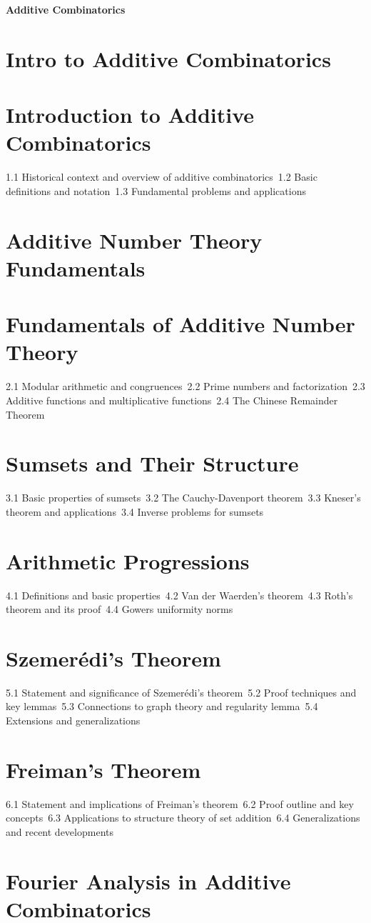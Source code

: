 {\LARGE \bf{Additive Combinatorics}}
\section{Intro to Additive Combinatorics}
\section{Introduction to Additive Combinatorics}
1.1 Historical context and overview of additive combinatorics\
1.2 Basic definitions and notation\
1.3 Fundamental problems and applications\
\section{Additive Number Theory Fundamentals}
\section{Fundamentals of Additive Number Theory}
2.1 Modular arithmetic and congruences\
2.2 Prime numbers and factorization\
2.3 Additive functions and multiplicative functions\
2.4 The Chinese Remainder Theorem\
\section{Sumsets and Their Structure}
3.1 Basic properties of sumsets\
3.2 The Cauchy-Davenport theorem\
3.3 Kneser's theorem and applications\
3.4 Inverse problems for sumsets\
\section{Arithmetic Progressions}
4.1 Definitions and basic properties\
4.2 Van der Waerden's theorem\
4.3 Roth's theorem and its proof\
4.4 Gowers uniformity norms\
\section{Szemerédi's Theorem}
5.1 Statement and significance of Szemerédi's theorem\
5.2 Proof techniques and key lemmas\
5.3 Connections to graph theory and regularity lemma\
5.4 Extensions and generalizations\
\section{Freiman's Theorem}
6.1 Statement and implications of Freiman's theorem\
6.2 Proof outline and key concepts\
6.3 Applications to structure theory of set addition\
6.4 Generalizations and recent developments\
\section{Fourier Analysis in Additive Combinatorics}
